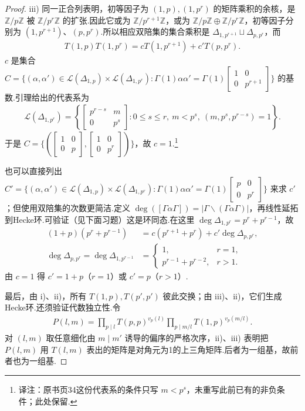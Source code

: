 \begin{proof}
iii) 同一正合列表明，初等因子为 $(1,p),(1,p^r)$ 的矩阵乘积的余核，是 $\mathbb Z/p\mathbb Z$ 被 $\mathbb Z/p^r\mathbb Z$ 的扩张.因此它或为 $\mathbb Z/p^{r+1}\mathbb Z$，或为 $\mathbb Z/p\mathbb Z\oplus\mathbb Z/p^r\mathbb Z$，初等因子分别为 $(1,p^{r+1})$、$(p,p^r)$.所以相应双陪集的集合乘积是 $\Delta_{1,p^{r+1}}\sqcup\Delta_{p,p^r}$，而
\begin{align*}
T(1,p)T(1,p^r)=cT(1,p^{r+1})+c'T(p,p^r).
\end{align*}
$c$ 是集合 $C=\{(\alpha,\alpha')\in\mathcal L(\Delta_{1,p})\times\mathcal L(\Delta_{1,p^r}):\Gamma(1)\alpha\alpha'=\Gamma(1)\left[\begin{smallmatrix}1&0\\0&p^{r+1}\end{smallmatrix}\right]\}$ 的基数.引理给出的代表系为
\begin{align*}
\mathcal L(\Delta_{1,p^r})=\left\{\begin{bmatrix}p^{r-s}&m\\0&p^s\end{bmatrix}:0\le s\le r,\ m<p^s,\ (m,p^s,p^{r-s})=1\right\}.
\end{align*}
于是 $C=\{(\left[\begin{smallmatrix}1&0\\0&p\end{smallmatrix}\right],\left[\begin{smallmatrix}1&0\\0&p^r\end{smallmatrix}\right])\}$，故 $c=1$.\footnote{译注：原书页34这份代表系的条件只写 $m<p^s$，未重写此前已有的非负条件；此处保留.}

也可以直接列出 $C'=\{(\alpha,\alpha')\in\mathcal L(\Delta_{1,p})\times\mathcal L(\Delta_{1,p^r}):\Gamma(1)\alpha\alpha'=\Gamma(1)\left[\begin{smallmatrix}p&0\\0&p^r\end{smallmatrix}\right]\}$ 来求 $c'$；但使用双陪集的次数更简洁.定义 $\deg([\Gamma\alpha\Gamma])=|\Gamma\backslash(\Gamma\alpha\Gamma)|$，再线性延拓到Hecke环.可验证（见下面习题）这是环同态.在这里 $\deg\Delta_{1,p^r}=p^r+p^{r-1}$，故
\begin{align*}
(1+p)(p^r+p^{r-1})&=c(p^{r+1}+p^r)+c'\deg\Delta_{p,p^r},\\
\deg\Delta_{p,p^r}=\deg\Delta_{1,p^{r-1}}&=\begin{cases}1,&r=1,\\p^{r-1}+p^{r-2},&r>1.\end{cases}
\end{align*}
由 $c=1$ 得 $c'=1+p$（$r=1$）或 $c'=p$（$r>1$）.

最后，由 i)、ii)，所有 $T(1,p),T(p',p')$ 彼此交换；由 iii)、ii)，它们生成Hecke环.还须验证代数独立性.令
\begin{align*}
P(l,m)=\prod_{p\mid l}T(p,p)^{v_p(l)}\prod_{p\mid m/l}T(1,p)^{v_p(m/l)}.
\end{align*}
对 $(l,m)$ 取任意细化由 $m\mid m'$ 诱导的偏序的严格次序，ii)、iii) 表明把 $P(l,m)$ 用 $T(l,m)$ 表出的矩阵是对角元为1的上三角矩阵.后者为一组基，故前者也为一组基.

\end{proof}

